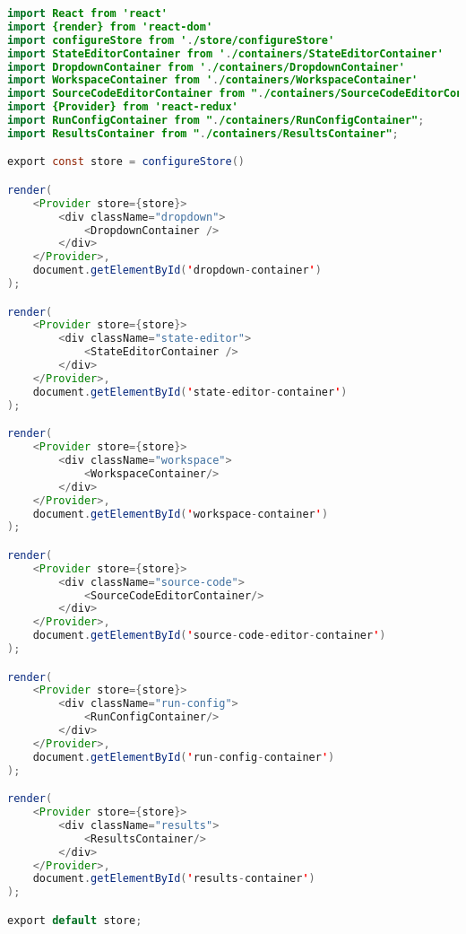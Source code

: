 \begin{lstlisting}[language=Java, 
label=lst:url_assign, 
caption={Точка входа приложения app.js.}]
import React from 'react'
import {render} from 'react-dom'
import configureStore from './store/configureStore'
import StateEditorContainer from './containers/StateEditorContainer'
import DropdownContainer from './containers/DropdownContainer'
import WorkspaceContainer from './containers/WorkspaceContainer'
import SourceCodeEditorContainer from "./containers/SourceCodeEditorContainer";
import {Provider} from 'react-redux'
import RunConfigContainer from "./containers/RunConfigContainer";
import ResultsContainer from "./containers/ResultsContainer";

export const store = configureStore()

render(
	<Provider store={store}>
		<div className="dropdown">
			<DropdownContainer />
		</div>
	</Provider>,
	document.getElementById('dropdown-container')
);

render(
	<Provider store={store}>
		<div className="state-editor">
			<StateEditorContainer />
		</div>
	</Provider>,
	document.getElementById('state-editor-container')
);

render(
	<Provider store={store}>
		<div className="workspace">
			<WorkspaceContainer/>
		</div>
	</Provider>,
	document.getElementById('workspace-container')
);

render(
	<Provider store={store}>
		<div className="source-code">
			<SourceCodeEditorContainer/>
		</div>
	</Provider>,
	document.getElementById('source-code-editor-container')
);

render(
	<Provider store={store}>
		<div className="run-config">
			<RunConfigContainer/>
		</div>
	</Provider>,
	document.getElementById('run-config-container')
);

render(
	<Provider store={store}>
		<div className="results">
			<ResultsContainer/>
		</div>
	</Provider>,
	document.getElementById('results-container')
);

export default store;
\end{lstlisting}